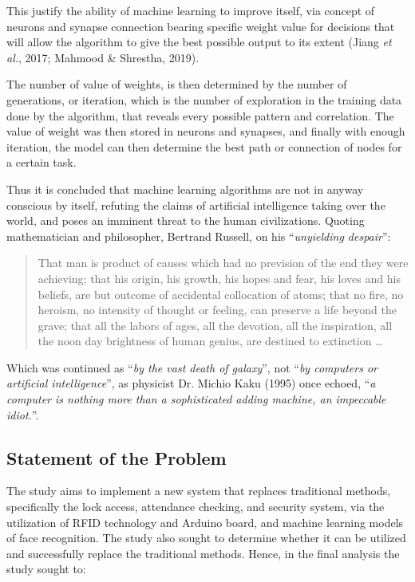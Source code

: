 \documentclass[12pt]{article}
\newcommand{\etl}{\textit{et al.}}
\begin{document}
This justify the ability of machine learning to improve itself, via concept of neurons and synapse connection bearing specific weight value for decisions that will allow the algorithm to give the best possible output to its extent (Jiang \etl, 2017; Mahmood \& Shrestha, 2019).

The number of value of weights, is then determined by the number of generations, or iteration, which is the number of exploration in the training data done by the algorithm, that reveals every possible pattern and correlation. The value of weight was then stored in neurons and synapses, and finally with enough iteration, the model can then determine the best path or connection of nodes for a certain task.

Thus it is concluded that machine learning algorithms are not in anyway conscious by itself, refuting the claims of artificial intelligence taking over the world, and poses an imminent threat to the human civilizations. Quoting mathematician and philosopher, Bertrand Russell, on his ``\textit{unyielding despair}'':

\begin{quote}
	That man is product of causes which had no prevision of the end they were achieving; that his origin, his growth, his hopes and fear, his loves and his beliefs, are but outcome of accidental collocation of atoms; that no fire, no heroism, no intensity of thought or feeling, can preserve a life beyond the grave; that all the labors of ages, all the devotion, all the inspiration, all the noon day brightness of human genius, are destined to extinction \dots
\end{quote}

Which was continued as ``\textit{by the vast death of galaxy}'', not ``\textit{by computers or artificial intelligence}'', as physicist Dr. Michio Kaku (1995) once echoed, ``\textit{a computer is nothing more than a sophisticated adding machine, an impeccable idiot.}''.

\newpage
\subsection*{Statement of the Problem\centering}

The study aims to implement a new system that replaces traditional methods, specifically the lock access, attendance checking, and security system, via the utilization of RFID technology and Arduino board, and machine learning models of face recognition. The study also sought to determine whether it can be utilized and successfully replace the traditional methods. Hence, in the final analysis the study sought to:
\end{document}
